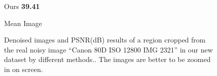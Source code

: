 \begin{figure}
{\begin{minipage}[t]{0.19\textwidth}
{\footnotesize Ours \textbf{39.41}}
\end{minipage}
\begin{minipage}[t]{0.19\textwidth}
\centering
{}
{\footnotesize Mean Image}
\end{minipage}
} 
    \caption{Denoised images and PSNR(dB) results of a region cropped from the real noisy image ``Canon 80D ISO 12800 IMG 2321'' in our new dataset by different methods.. The images are better to be zoomed in on screen.}
    \label{fig3-18}
\end{figure}

